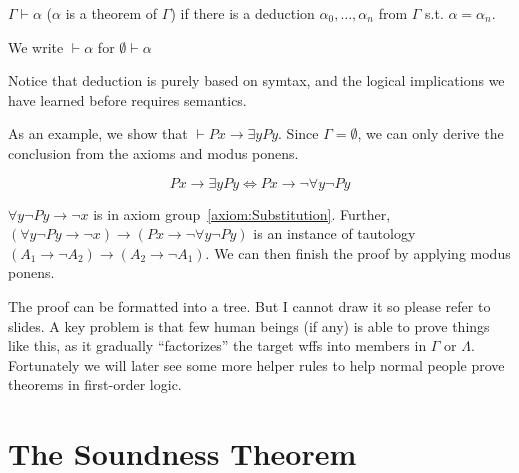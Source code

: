 \begin{definition}
    $\Gamma\vdash\alpha$ ($\alpha$ is a theorem of $\Gamma$) if there is a deduction $\alpha_0,\dots,\alpha_n$ from $\Gamma$ s.t. $\alpha=\alpha_n$.

    We write $\vdash\alpha$ for $\emptyset\vdash\alpha$
\end{definition}

Notice that deduction is purely based on symtax, and the logical implications we have learned before requires semantics.

As an example, we show that $\vdash Px \to \exists yPy$. Since $\Gamma = \emptyset$, we can only derive the conclusion from the axioms and modus ponens.

\[ Px \to \exists yPy \iff Px \to \neg\forall y \neg Py \]

$\forall y \neg Py \to \neg x$ is in axiom group~\ref{axiom:Substitution}. Further, $(\forall y \neg Py \to \neg x) \to (Px \to \neg \forall y \neg Py)$ is an instance of tautology $(A_1 \to \neg A_2) \to (A_2 \to \neg A_1)$. We can then finish the proof by applying modus ponens.

The proof can be formatted into a tree. But I cannot draw it so please refer to slides. A key problem is that few human beings (if any) is able to prove things like this, as it gradually ``factorizes'' the target wffs into members in $\Gamma$ or $\Lambda$. Fortunately we will later see some more helper rules to help normal people prove theorems in first-order logic.

\section{The Soundness Theorem}
